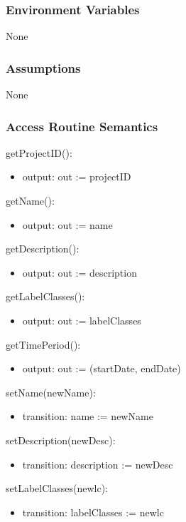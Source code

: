 \documentclass[12pt, titlepage]{article}
\begin{document}
\subsubsection{Environment Variables}
None

\subsubsection{Assumptions}
None

\subsubsection{Access Routine Semantics}

\noindent getProjectID():
\begin{itemize}
\item output: out := projectID
\end{itemize}

\noindent getName():
\begin{itemize}
\item output: out := name
\end{itemize}

\noindent getDescription():
\begin{itemize}
\item output: out := description
\end{itemize}

\noindent getLabelClasses():
\begin{itemize}
\item output: out := labelClasses
\end{itemize}

\noindent getTimePeriod():
\begin{itemize}
\item output: out := (startDate, endDate)
\end{itemize}

\noindent setName(newName):
\begin{itemize}
\item transition: name := newName 
\end{itemize}

\noindent setDescription(newDesc):
\begin{itemize}
\item transition: description := newDesc
\end{itemize}

\noindent setLabelClasses(newlc):
\begin{itemize}
\item transition: labelClasses := newlc 
\end{itemize}
\end{document}
